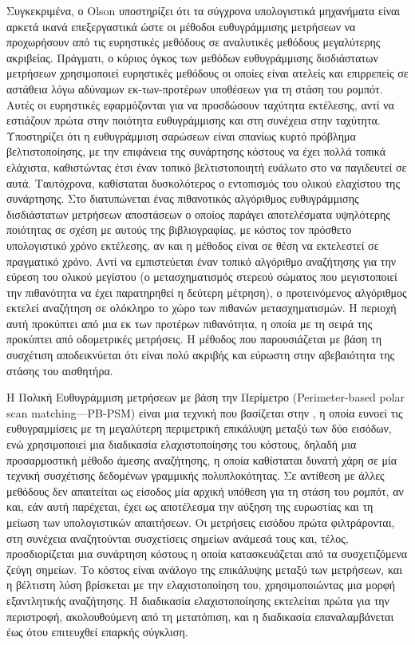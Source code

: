 Συγκεκριμένα, ο Olson \cite{Olson2009a} υποστηρίζει ότι τα σύγχρονα
υπολογιστικά μηχανήματα είναι αρκετά ικανά επεξεργαστικά ώστε οι μέθοδοι
ευθυγράμμισης μετρήσεων να προχωρήσουν από τις ευρηστικές μεθόδους σε
αναλυτικές μεθόδους μεγαλύτερης ακριβείας. Πράγματι, ο κύριος όγκος των μεθόδων
ευθυγράμμισης δισδιάστατων μετρήσεων χρησιμοποιεί ευρηστικές μεθόδους οι οποίες
είναι ατελείς και επιρρεπείς σε αστάθεια λόγω αδύναμων εκ-των-προτέρων
υποθέσεων για τη στάση του ρομπότ. Αυτές οι ευρηστικές εφαρμόζονται για να
προσδώσουν ταχύτητα εκτέλεσης, αντί να εστιάζουν πρώτα στην ποιότητα
ευθυγράμμισης και στη συνέχεια στην ταχύτητα. Υποστηρίζει ότι η ευθυγράμμιση
σαρώσεων είναι σπανίως κυρτό πρόβλημα βελτιστοποίησης, με την επιφάνεια της
συνάρτησης κόστους να έχει πολλά τοπικά ελάχιστα, καθιστώντας έτσι έναν τοπικό
βελτιστοποιητή ευάλωτο στο να παγιδευτεί σε αυτά. Ταυτόχρονα, καθίσταται
δυσκολότερος ο εντοπισμός του ολικού ελαχίστου της συνάρτησης. Στο
\cite{Olson2009a} διατυπώνεται ένας πιθανοτικός αλγόριθμος ευθυγράμμισης
δισδιάστατων μετρήσεων αποστάσεων ο οποίος παράγει αποτελέσματα υψηλότερης
ποιότητας σε σχέση με αυτούς της βιβλιογραφίας, με κόστος τον πρόσθετο
υπολογιστικό χρόνο εκτέλεσης, αν και η μέθοδος είναι σε θέση να εκτελεστεί σε
πραγματικό χρόνο. Αντί να εμπιστεύεται έναν τοπικό αλγόριθμο αναζήτησης για την
εύρεση του ολικού μεγίστου (ο μετασχηματισμός στερεού σώματος που μεγιστοποιεί
την πιθανότητα να έχει παρατηρηθεί η δεύτερη μέτρηση), ο προτεινόμενος
αλγόριθμος εκτελεί αναζήτηση σε ολόκληρο το χώρο των πιθανών μετασχηματισμών. Η
περιοχή αυτή προκύπτει από μια εκ των προτέρων πιθανότητα, η οποία με τη σειρά
της προκύπτει από οδομετρικές μετρήσεις. Η μέθοδος που παρουσιάζεται με βάση τη
συσχέτιση αποδεικνύεται ότι είναι πολύ ακριβής και εύρωστη στην αβεβαιότητα της
στάσης του αισθητήρα.

Η Πολική Ευθυγράμμιση μετρήσεων με βάση την Περίμετρο (Perimeter-based polar
scan matching---PB-PSM) \cite{Friedman2015} είναι μια τεχνική που βασίζεται
στην \cite{Diosi2005}, η οποία ευνοεί τις ευθυγραμμίσεις με τη μεγαλύτερη
περιμετρική επικάλυψη μεταξύ των δύο εισόδων, ενώ χρησιμοποιεί μια διαδικασία
ελαχιστοποίησης του κόστους, δηλαδή μια προσαρμοστική μέθοδο άμεσης αναζήτησης,
η οποία καθίσταται δυνατή χάρη σε μία τεχνική συσχέτισης δεδομένων γραμμικής
πολυπλοκότητας. Σε αντίθεση με άλλες μεθόδους δεν απαιτείται ως είσοδος μία
αρχική υπόθεση για τη στάση του ρομπότ, αν και, εάν αυτή παρέχεται, έχει ως
αποτέλεσμα την αύξηση της ευρωστίας και τη μείωση των υπολογιστικών απαιτήσεων.
Οι μετρήσεις εισόδου πρώτα φιλτράρονται, στη συνέχεια αναζητούνται συσχετίσεις
σημείων ανάμεσά τους και, τέλος, προσδιορίζεται μια συνάρτηση κόστους η οποία
κατασκευάζεται από τα συσχετιζόμενα ζεύγη σημείων. Το κόστος είναι ανάλογο της
επικάλυψης μεταξύ των μετρήσεων, και η βέλτιστη λύση βρίσκεται με την
ελαχιστοποίηση του, χρησιμοποιώντας μια μορφή εξαντλητικής αναζήτησης. Η
διαδικασία ελαχιστοποίησης εκτελείται πρώτα για την περιστροφή, ακολουθούμενη
από τη μετατόπιση, και η διαδικασία επαναλαμβάνεται έως ότου επιτευχθεί επαρκής
σύγκλιση.

